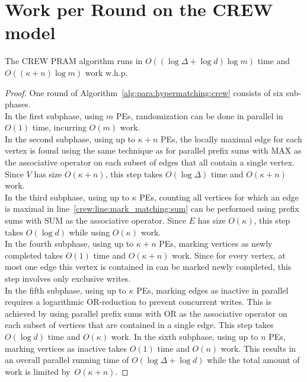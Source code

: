 \documentclass[runningheads]{llncs}
\begin{document}
\clearpage
\appendix
\section{Work per Round on the CREW model}
\label{app:crew:proof}
\begin{theorem}
        The CREW PRAM algorithm runs in $O((\log{\Delta} + \log{d}) \log{m})$ time and $O((\kappa + n) \log{m})$ work \hbox{w.h.p.}
\end{theorem}
\begin{proof}
 One round of Algorithm~\ref{alg:para:hypermatching:crew} consists of six sub-phases. \\
   In the first subphase, using $m$ PEs, randomization can be done in parallel in $O(1)$ time, incurring $O(m)$ work. \\
 In the second subphase, using up to  $\kappa + n$ PEs, the locally maximal edge for each vertex is found using the same technique as for parallel prefix sums with MAX as the associative operator on each subset of edges that all contain a single vertex. Since $V$ has size $O(\kappa + n)$, this step takes $O(\log{\Delta})$ time and $O(\kappa + n)$ work. \\
 In the third subphase, using up to $\kappa$ PEs, counting all vertices for which an edge is maximal in line~\ref{crew:line:mark_matching:sum} can be performed using prefix sums with $\text{SUM}$ as the associative operator. Since $E$ has size $O(\kappa)$, this step takes $O(\log{d})$ while using $O(\kappa)$ work. \\
 In the fourth subphase, using up to $\kappa + n$ PEs, marking vertices as newly completed takes $O(1)$ time and $O(\kappa + n)$ work. Since for every vertex, at most one
edge this vertex is contained in can be marked newly completed, this step involves only exclusive writes. \\
 In the fifth subphase, using up to $\kappa$ PEs, marking edges as inactive in parallel requires a logarithmic OR-reduction to prevent concurrent writes. This is achieved by using parallel prefix sums with OR as the associative operator on each subset of vertices that are contained in a single edge. This step takes $O(\log{d})$ time and $O(\kappa)$ work.
 In the sixth subphase, using up to $n$ PEs, marking vertices as inactive takes $O(1)$ time and $O(n)$ work.
 This results in an overall parallel running time of $O(\log{\Delta} + \log{d})$ while the total amount of work is limited by~$O(\kappa + n)$.
\end{proof}
\end{document}
